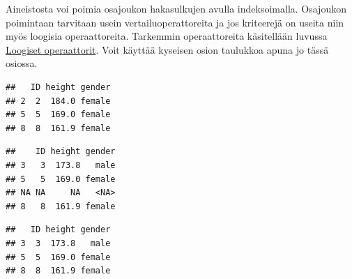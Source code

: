 \documentclass[
]{book}
\newenvironment{Shaded}{\begin{snugshade}}{\end{snugshade}}
\newcommand{\CommentTok}[1]{\textcolor[rgb]{0.56,0.35,0.01}{\textit{#1}}}
\newcommand{\DecValTok}[1]{\textcolor[rgb]{0.00,0.00,0.81}{#1}}
\newcommand{\FunctionTok}[1]{\textcolor[rgb]{0.00,0.00,0.00}{#1}}
\newcommand{\NormalTok}[1]{#1}
\newcommand{\SpecialCharTok}[1]{\textcolor[rgb]{0.00,0.00,0.00}{#1}}
\newcommand{\StringTok}[1]{\textcolor[rgb]{0.31,0.60,0.02}{#1}}
\begin{document}
Aineistosta voi poimia osajoukon hakasulkujen avulla indeksoimalla. Osajoukon poimintaan tarvitaan usein vertailuoperattoreita ja jos kriteerejä on useita niin myös loogisia operaattoreita. Tarkemmin operaattoreita käsitellään luvussa \protect\hyperlink{loogiset-operaattorit}{Loogiset operaattorit}. Voit käyttää kyseisen osion taulukkoa apuna jo tässä osiossa.

\begin{Shaded}
\end{Shaded}

\begin{verbatim}
##   ID height gender
## 2  2  184.0 female
## 5  5  169.0 female
## 8  8  161.9 female
\end{verbatim}

\begin{Shaded}
\end{Shaded}

\begin{verbatim}
##    ID height gender
## 3   3  173.8   male
## 5   5  169.0 female
## NA NA     NA   <NA>
## 8   8  161.9 female
\end{verbatim}

\begin{Shaded}
\end{Shaded}

\begin{verbatim}
##   ID height gender
## 3  3  173.8   male
## 5  5  169.0 female
## 8  8  161.9 female
\end{verbatim}
\end{document}
